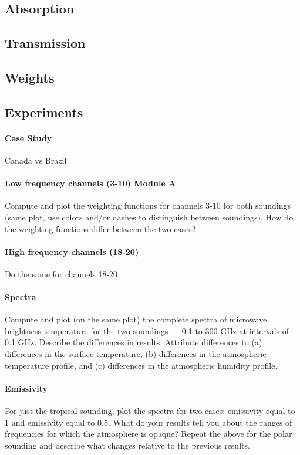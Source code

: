 \documentclass[twocol]{ametsoc}
\begin{document}
\subsection{Absorption}

\subsection{Transmission}

\subsection{Weights}

\subsection{Experiments}

\paragraph*{Case Study} Canada vs Brazil

\paragraph{Low frequency channels (3-10) Module A }
 Compute and plot the weighting functions for channels 3-10 for both soundings (same plot, use colors and/or dashes to distinguish between soundings).  How do the weighting functions differ between the two cases?
 
\paragraph{High frequency channels (18-20)}
Do the same for channels 18-20.

\paragraph{Spectra}
Compute and plot (on the same plot) the complete spectra of microwave brightness temperature for the two soundings — 0.1 to 300 GHz at intervals of 0.1 GHz.   Describe the differences in results. 
Attribute differences to (a) differences in the surface temperature, (b) differences in the atmospheric temperature profile, and (c) differences in the atmospheric humidity profile.

\paragraph{Emissivity}
For just the tropical sounding, plot the spectra for two cases:  emissivity equal to 1  and emissivity equal to 0.5.  What do your results tell you about the ranges of frequencies for which the atmosphere is opaque?
Repeat the above for the polar sounding and describe what changes relative to the previous results.
\end{document}
